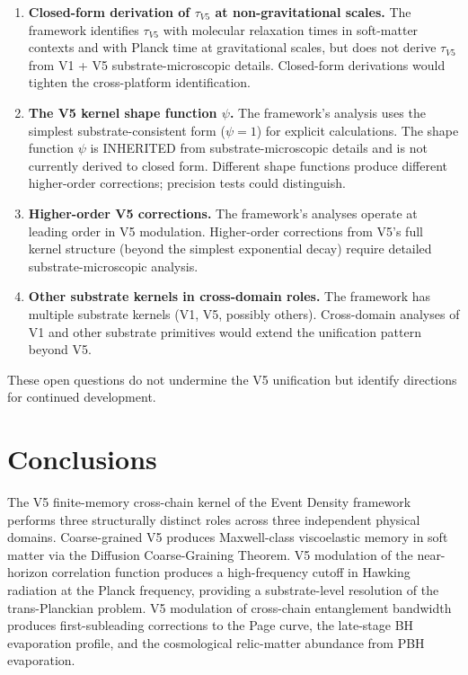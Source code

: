\documentclass[11pt,a4paper]{article}
\begin{document}
\begin{enumerate}[noitemsep]
\item \textbf{Closed-form derivation of $\tau_{V5}$ at non-gravitational scales.} The framework identifies $\tau_{V5}$ with molecular relaxation times in soft-matter contexts and with Planck time at gravitational scales, but does not derive $\tau_{V5}$ from V1 + V5 substrate-microscopic details. Closed-form derivations would tighten the cross-platform identification.
\item \textbf{The V5 kernel shape function $\psi$.} The framework's analysis uses the simplest substrate-consistent form ($\psi = 1$) for explicit calculations. The shape function $\psi$ is INHERITED from substrate-microscopic details and is not currently derived to closed form. Different shape functions produce different higher-order corrections; precision tests could distinguish.
\item \textbf{Higher-order V5 corrections.} The framework's analyses operate at leading order in V5 modulation. Higher-order corrections from V5's full kernel structure (beyond the simplest exponential decay) require detailed substrate-microscopic analysis.
\item \textbf{Other substrate kernels in cross-domain roles.} The framework has multiple substrate kernels (V1, V5, possibly others). Cross-domain analyses of V1 and other substrate primitives would extend the unification pattern beyond V5.
\end{enumerate}

These open questions do not undermine the V5 unification but identify directions for continued development.

\section{Conclusions}

The V5 finite-memory cross-chain kernel of the Event Density framework performs three structurally distinct roles across three independent physical domains. Coarse-grained V5 produces Maxwell-class viscoelastic memory in soft matter via the Diffusion Coarse-Graining Theorem. V5 modulation of the near-horizon correlation function produces a high-frequency cutoff in Hawking radiation at the Planck frequency, providing a substrate-level resolution of the trans-Planckian problem. V5 modulation of cross-chain entanglement bandwidth produces first-subleading corrections to the Page curve, the late-stage BH evaporation profile, and the cosmological relic-matter abundance from PBH evaporation.
\end{document}
